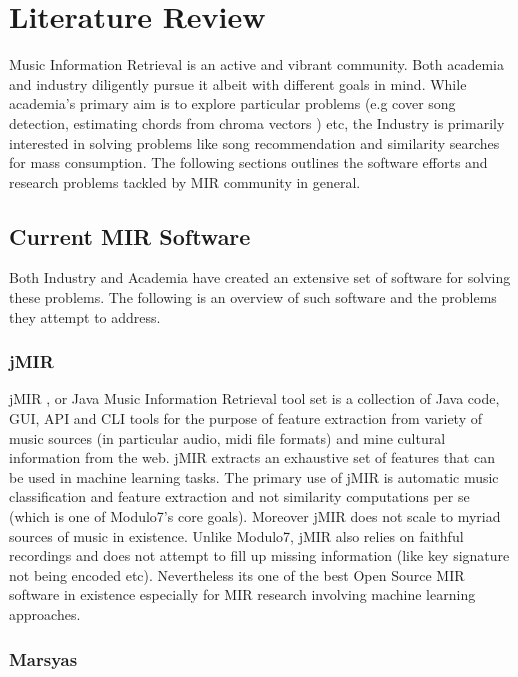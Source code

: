 \chapter{Literature Review}

\noindent Music Information Retrieval is an active and vibrant community. Both academia and industry diligently pursue it albeit with different goals in mind. While academia's primary aim is to explore particular problems (e.g cover song detection, estimating chords from chroma vectors \cite{chord-detection} ) etc, the Industry is primarily interested in solving problems like song recommendation and similarity searches for mass consumption. The following sections outlines the software efforts and research problems tackled by MIR community in general. 

\section{Current MIR Software}
\noindent Both Industry and Academia have created an extensive set of software for solving these problems. The following is an overview of such software and the problems they attempt to address.

\subsection{jMIR}

\noindent jMIR  \cite{jMIR}, or Java Music Information Retrieval tool set is a collection of Java code, GUI, API and CLI tools for the purpose of feature extraction from variety of music sources (in particular audio, midi file formats) and mine cultural information from the web. jMIR extracts an exhaustive set of features that can be used in machine learning tasks. The primary use of jMIR is automatic music classification and feature extraction and not similarity computations per se (which is one of Modulo7's core goals). Moreover jMIR does not scale to myriad sources of music in existence. Unlike Modulo7, jMIR also relies on faithful recordings and does not attempt to fill up missing information (like key signature not being encoded etc). Nevertheless its one of the best Open Source MIR software in existence especially for MIR research involving machine learning approaches. 

\subsection{Marsyas}

